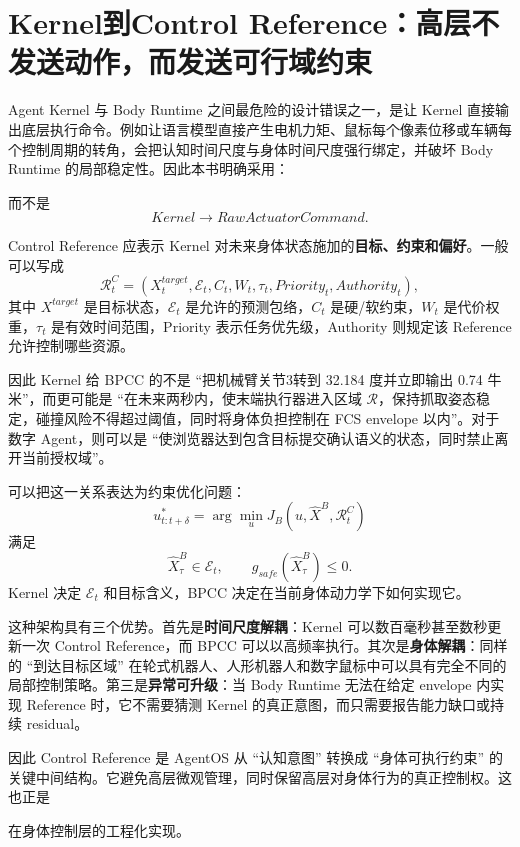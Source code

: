 \section{Kernel到Control Reference：高层不发送动作，而发送可行域约束}

Agent Kernel 与 Body Runtime 之间最危险的设计错误之一，是让 Kernel 直接输出底层执行命令。例如让语言模型直接产生电机力矩、鼠标每个像素位移或车辆每个控制周期的转角，会把认知时间尺度与身体时间尺度强行绑定，并破坏 Body Runtime 的局部稳定性。因此本书明确采用：
\begin{statementbox}
\centering
{}
\end{statementbox}
而不是
\[
Kernel
\rightarrow
RawActuatorCommand .
\]

Control Reference 应表示 Kernel 对未来身体状态施加的\textbf{目标、约束和偏好}。一般可以写成
\[
\mathcal R^C_t
=
\left(
X^{target}_t,
\mathcal E_t,
C_t,
W_t,
\tau_t,
Priority_t,
Authority_t
\right),
\]
其中 $X^{target}$ 是目标状态，$\mathcal E_t$ 是允许的预测包络，$C_t$ 是硬/软约束，$W_t$ 是代价权重，$\tau_t$ 是有效时间范围，Priority 表示任务优先级，Authority 则规定该 Reference 允许控制哪些资源。

因此 Kernel 给 BPCC 的不是 ``把机械臂关节3转到 32.184 度并立即输出 0.74 牛米''，而更可能是 ``在未来两秒内，使末端执行器进入区域 $\mathcal R$，保持抓取姿态稳定，碰撞风险不得超过阈值，同时将身体负担控制在 FCS envelope 以内''。对于数字 Agent，则可以是 ``使浏览器达到包含目标提交确认语义的状态，同时禁止离开当前授权域''。

可以把这一关系表达为约束优化问题：
\[
u^*_{t:t+\delta}
=
\arg\min_u
J_B
\left(
u,
\hat X^B,
\mathcal R^C_t
\right)
\]
满足
\[
\hat X^B_{\tau}
\in
\mathcal E_t,
\qquad
g_{safe}(\hat X^B_\tau)\leq0.
\]
Kernel 决定 $\mathcal E_t$ 和目标含义，BPCC 决定在当前身体动力学下如何实现它。

这种架构具有三个优势。首先是\textbf{时间尺度解耦}：Kernel 可以数百毫秒甚至数秒更新一次 Control Reference，而 BPCC 可以以高频率执行。其次是\textbf{身体解耦}：同样的 ``到达目标区域'' 在轮式机器人、人形机器人和数字鼠标中可以具有完全不同的局部控制策略。第三是\textbf{异常可升级}：当 Body Runtime 无法在给定 envelope 内实现 Reference 时，它不需要猜测 Kernel 的真正意图，而只需要报告能力缺口或持续 residual。

因此 Control Reference 是 AgentOS 从 ``认知意图'' 转换成 ``身体可执行约束'' 的关键中间结构。它避免高层微观管理，同时保留高层对身体行为的真正控制权。这也正是
\begin{statementbox}
\centering
{}
\end{statementbox}
在身体控制层的工程化实现。


